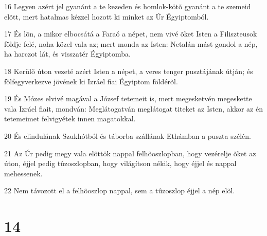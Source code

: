 \par 16 Legyen azért jel gyanánt a te kezeden és homlok-kötõ gyanánt a te szemeid elõtt, mert hatalmas kézzel hozott ki minket az Úr Égyiptomból.
\par 17 És lõn, a mikor elbocsátá a Faraó a népet, nem vivé õket Isten a Filiszteusok földje felé, noha közel vala az; mert monda az Isten: Netalán mást gondol a nép, ha harczot lát, és visszatér Égyiptomba.
\par 18 Kerülõ úton vezeté azért Isten a népet, a veres tenger pusztájának útján; és fölfegyverkezve jövének ki Izráel fiai Égyiptom földérõl.
\par 19 És Mózes elvivé magával a József tetemeit is, mert megesketvén megeskette vala Izráel fiait, mondván: Meglátogatván meglátogat titeket az Isten, akkor az én tetemeimet felvigyétek innen magatokkal.
\par 20 És elindulának Szukhótból és táborba szállának Ethámban a puszta szélén.
\par 21 Az Úr pedig megy vala elõttök nappal felhõoszlopban, hogy vezérelje õket az úton, éjjel pedig tûzoszlopban, hogy világítson nékik, hogy éjjel és nappal mehessenek.
\par 22 Nem távozott el a felhõoszlop nappal, sem a tûzoszlop éjjel a nép elõl.

\chapter{14}

